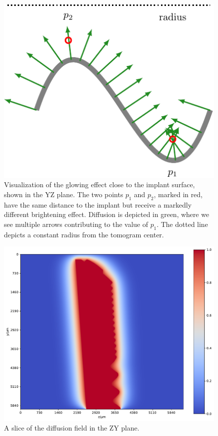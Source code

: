 \begin{figure}
    \centering
    \includegraphics{glowing-crop}
    \caption{
        Visualization of the glowing effect close to the implant surface, shown
        in the YZ plane. The two points $p_1$ and $p_2$, marked in red, have
        the same distance to the implant but receive a markedly different
        brightening effect. Diffusion is depicted in green, where we see
        multiple arrows contributing to the value of $p_1$. The dotted line
        depicts a constant radius from the tomogram center.
    }
    \label{fig:edt-vs-diffusion}
\end{figure}

\begin{figure}
    \includegraphics[width=\linewidth]{generated/770c_pag_diffusion_zy.pdf}
    \caption{A slice of the diffusion field in the ZY plane.}
    \label{fig:field-slice}
\end{figure}

